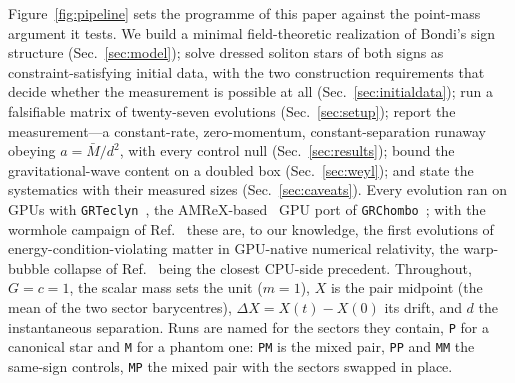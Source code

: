 \documentclass[twocolumn,floatfix,aps,prd,nofootinbib]{revtex4-2}
\begin{document}
Figure~\ref{fig:pipeline} sets the programme of this paper against the point-mass argument it tests. We build a minimal field-theoretic realization of Bondi's sign structure (Sec.~\ref{sec:model}); solve dressed soliton stars of both signs as constraint-satisfying initial data, with the two construction requirements that decide whether the measurement is possible at all (Sec.~\ref{sec:initialdata}); run a falsifiable matrix of twenty-seven evolutions (Sec.~\ref{sec:setup}); report the measurement---a constant-rate, zero-momentum, constant-separation runaway obeying $a=\bar M/d^2$, with every control null (Sec.~\ref{sec:results}); bound the gravitational-wave content on a doubled box (Sec.~\ref{sec:weyl}); and state the systematics with their measured sizes (Sec.~\ref{sec:caveats}). Every evolution ran on GPUs with \texttt{GRTeclyn}~\cite{grteclyn}, the AMReX-based~\cite{amrex} GPU port of \texttt{GRChombo}~\cite{grchombo}; with the wormhole campaign of Ref.~\cite{shirokov2026} these are, to our knowledge, the first evolutions of energy-condition-violating matter in GPU-native numerical relativity, the warp-bubble collapse of Ref.~\cite{clough2024} being the closest CPU-side precedent. Throughout, $G=c=1$, the scalar mass sets the unit ($m=1$), $X$ is the pair midpoint (the mean of the two sector barycentres), $\Delta X=X(t)-X(0)$ its drift, and $d$ the instantaneous separation. Runs are named for the sectors they contain, \texttt{P} for a canonical star and \texttt{M} for a phantom one: \texttt{PM} is the mixed pair, \texttt{PP} and \texttt{MM} the same-sign controls, \texttt{MP} the mixed pair with the sectors swapped in place.
\end{document}
